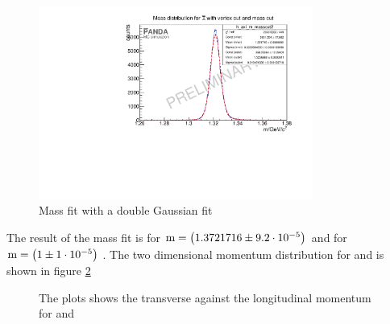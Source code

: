 		\begin{figure}
			\centering
				\includegraphics[width=0.8\textwidth]{./plots/Xi/XiPlus_m_masscut.pdf}
			\caption{Mass fit with a double Gaussian fit}
			\label{fig:XiPlus_massfit}
		\end{figure}
		The result of the mass fit is for \anticascade $\textnormal{m} = \left( 1.3721716 \pm 9.2\cdot 10^{-5}\right)$ \massunit 
		and for \cascade $\textnormal{m} = \left( 1\pm 1\cdot 10^{-5}\right)$ \massunit.
		The two dimensional momentum distribution for \anticascade and \cascade is shown in figure \ref{fig:XiPlus_pt_vs_pz} 
		
		\begin{figure}
			\caption{The plots shows the transverse against the longitudinal momentum for \anticascade and \cascade}
			\label{fig:XiPlus_pt_vs_pz}
		
		\end{figure}
		
